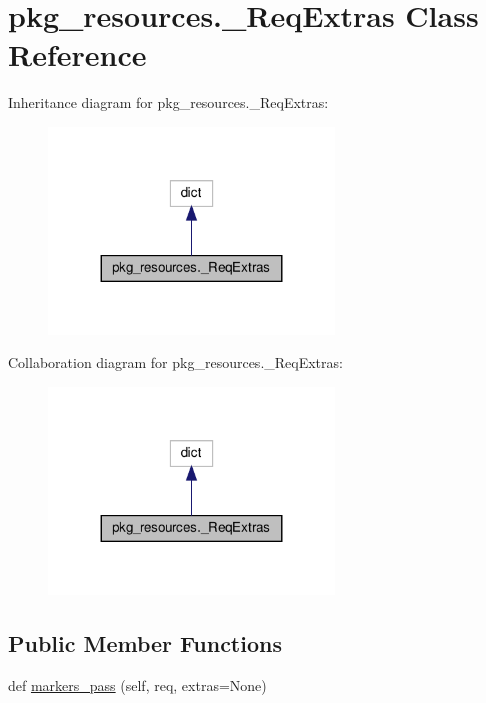 \hypertarget{classpkg__resources_1_1__ReqExtras}{}\section{pkg\+\_\+resources.\+\_\+\+Req\+Extras Class Reference}
\label{classpkg__resources_1_1__ReqExtras}


Inheritance diagram for pkg\+\_\+resources.\+\_\+\+Req\+Extras\+:
\nopagebreak
\begin{figure}[H]
\begin{center}
\leavevmode
\includegraphics[width=215pt]{classpkg__resources_1_1__ReqExtras__inherit__graph}
\end{center}
\end{figure}


Collaboration diagram for pkg\+\_\+resources.\+\_\+\+Req\+Extras\+:
\nopagebreak
\begin{figure}[H]
\begin{center}
\leavevmode
\includegraphics[width=215pt]{classpkg__resources_1_1__ReqExtras__coll__graph}
\end{center}
\end{figure}
\subsection*{Public Member Functions}
\begin{DoxyCompactItemize}
\item 
def \hyperlink{classpkg__resources_1_1__ReqExtras_a435242531f1af2132de48679c5edf3c7}{markers\+\_\+pass} (self, req, extras=None)
\end{DoxyCompactItemize}


